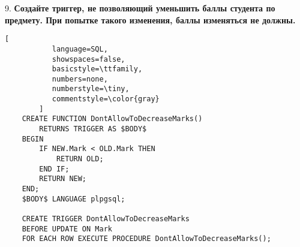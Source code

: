 \documentclass[11pt,a4paper,oneside]{article}
\begin{document}
9. \textbf{Создайте триггер, не позволяющий уменьшить баллы студента по предмету. При попытке такого изменения, баллы изменяться не должны.}
\begin{lstlisting}[
           language=SQL,
           showspaces=false,
           basicstyle=\ttfamily,
           numbers=none,
           numberstyle=\tiny,
           commentstyle=\color{gray}
        ]
    CREATE FUNCTION DontAllowToDecreaseMarks()
        RETURNS TRIGGER AS $BODY$
    BEGIN
        IF NEW.Mark < OLD.Mark THEN
            RETURN OLD;
        END IF;
        RETURN NEW;
    END;
    $BODY$ LANGUAGE plpgsql;

    CREATE TRIGGER DontAllowToDecreaseMarks
    BEFORE UPDATE ON Mark
    FOR EACH ROW EXECUTE PROCEDURE DontAllowToDecreaseMarks();
\end{lstlisting}
\end{document}
